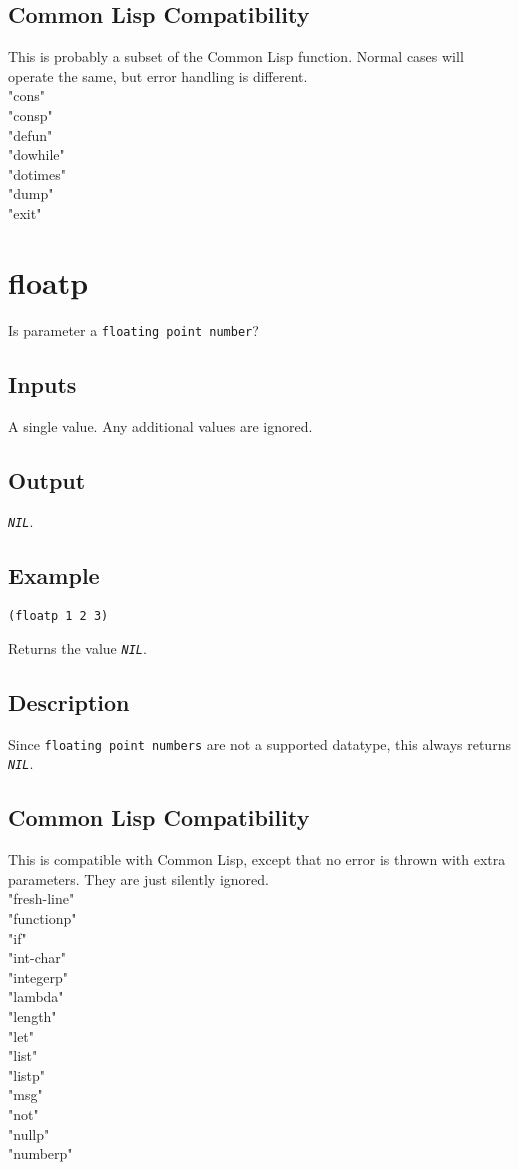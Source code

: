 \documentclass[10pt, openany]{book}
\newcommand{\constant}[1]{\emph{\texttt{#1}}}
\newcommand{\datatype}[1]{\texttt{#1}}
\newcommand{\cl}{Common Lisp}
\begin{document}
\subsection{Common Lisp Compatibility}
This is probably a subset of the \cl{} function.  Normal cases will operate the same, but error handling is different.
\\
      "cons"\\
      "consp"\\
      "defun"\\
      "dowhile"\\
      "dotimes"\\
      "dump"\\
      "exit"\\

\section{floatp}
Is parameter a \datatype{floating point number}?
\subsection{Inputs}
A single value.  Any additional values are ignored.
\subsection{Output}
\constant{NIL}.
\subsection{Example}
\begin{lstlisting}
(floatp 1 2 3)
\end{lstlisting}
Returns the value \constant{NIL}.
\subsection{Description}
Since \datatype{floating point numbers} are not a supported datatype, this always returns \constant{NIL}.
\subsection{Common Lisp Compatibility}
This is compatible with \cl, except that no error is thrown with extra parameters.  They are just silently ignored.
\\
      "fresh-line"\\
      "functionp"\\
      "if"\\
      "int-char"\\
      "integerp"\\
      "lambda"\\
      "length"\\
      "let"\\
      "list"\\
      "listp"\\
      "msg"\\
      "not"\\
      "nullp"\\
      "numberp"\\
\end{document}
